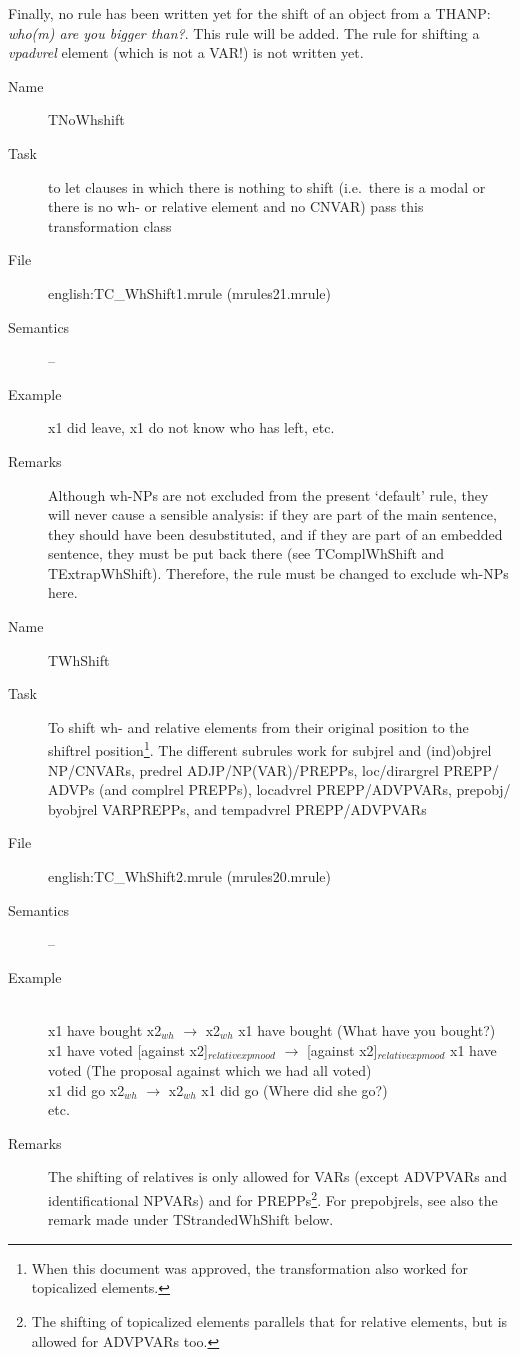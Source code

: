 \begin{description}
Finally, no rule has been written yet for the shift of an object from a THANP: {
\em who(m) are you bigger than?\/}. This rule will be added. The rule for 
shifting a {\em vpadvrel\/} element (which is not a VAR!) is not written yet.

\vspace{1 cm}
\begin{description}
\item[Name] TNoWhshift
\item[Task] to let clauses in which there is nothing to shift (i.e.\ there is a 
modal or there is no wh- or relative element and no CNVAR) pass this 
transformation class
\item[File] english:TC\_WhShift1.mrule (mrules21.mrule)
\item[Semantics] --
\item[Example] x1 did leave, x1 do not know who has left, etc.
\item[Remarks] 
Although wh-NPs are not excluded from the present `default' rule, they will 
never cause a sensible analysis: if they are part of the main sentence, they 
should have been desubstituted, and if they are part of an embedded sentence, 
they must be put back there (see TComplWhShift and TExtrapWhShift).
Therefore, the rule must be changed to exclude wh-NPs here.
\end{description}

\vspace{1 cm}
\begin{description}
\item[Name] TWhShift
\item[Task] To shift wh- and relative elements from their original position to 
the shiftrel position\footnote{When this document was approved, the 
transformation also worked for topicalized elements.}. 
The different subrules work for subjrel and (ind)objrel 
NP/CNVARs, 
predrel ADJP/NP(VAR)/PREPPs, loc/dirargrel PREPP/
ADVPs (and complrel PREPPs), locadvrel PREPP/ADVPVARs, prepobj/
byobjrel VARPREPPs, and 
tempadvrel PREPP/ADVPVARs
\item[File] english:TC\_WhShift2.mrule (mrules20.mrule)
\item[Semantics] --
\item[Example] \mbox{}\\
x1 have bought x2$_{wh}$ $\rightarrow$ x2$_{wh}$ x1 have bought 
(What have you bought?)\\
x1 have voted [against x2]$_{relativexpmood}$ $\rightarrow$ [against x2]$_{
relativexpmood}$ x1 have voted (The proposal against which we had all voted)\\
x1 did go x2$_{wh}$ $\rightarrow$ x2$_{wh}$ x1 did go (Where did she go?)\\
etc.
\item[Remarks] The shifting of relatives is only allowed for VARs (except 
ADVPVARs and identificational NPVARs) and for PREPPs\footnote{The shifting of 
topicalized elements parallels that for relative elements, but is allowed 
for ADVPVARs too.}. For 
prepobjrels, see also the remark made under TStrandedWhShift below.
\end{description}


\end{description}
